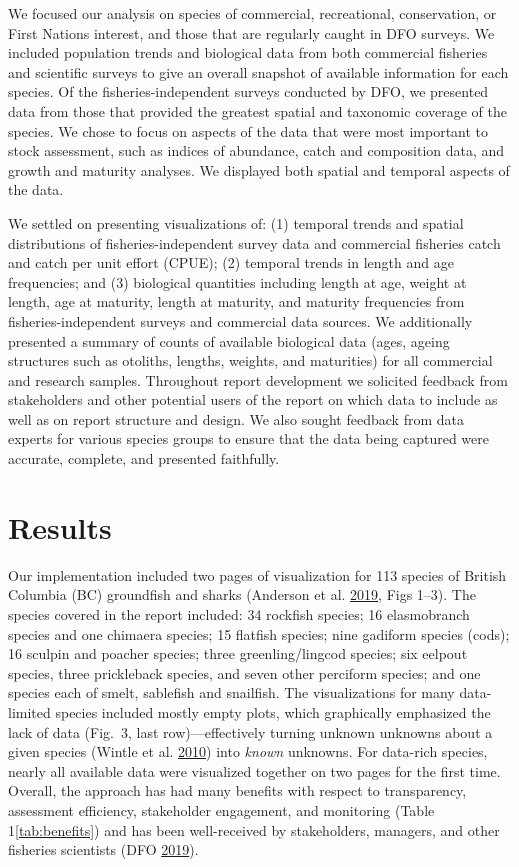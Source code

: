 \documentclass[12pt,]{article}
\begin{document}
We focused our analysis on species of commercial, recreational, conservation, or First Nations interest, and those that are regularly caught in DFO surveys. We included population trends and biological data from both commercial fisheries and scientific surveys to give an overall snapshot of available information for each species. Of the fisheries-independent surveys conducted by DFO, we presented data from those that provided the greatest spatial and taxonomic coverage of the species. We chose to focus on aspects of the data that were most important to stock assessment, such as indices of abundance, catch and composition data, and growth and maturity analyses. We displayed both spatial and temporal aspects of the data.

We settled on presenting visualizations of: (1) temporal trends and spatial distributions of fisheries-independent survey data and commercial fisheries catch and catch per unit effort (CPUE); (2) temporal trends in length and age frequencies; and (3) biological quantities including length at age, weight at length, age at maturity, length at maturity, and maturity frequencies from fisheries-independent surveys and commercial data sources. We additionally presented a summary of counts of available biological data (ages, ageing structures such as otoliths, lengths, weights, and maturities) for all commercial and research samples. Throughout report development we solicited feedback from stakeholders and other potential users of the report on which data to include as well as on report structure and design. We also sought feedback from data experts for various species groups to ensure that the data being captured were accurate, complete, and presented faithfully.

\hypertarget{results}{%
\section*{Results}\label{results}}

Our implementation included two pages of visualization for 113 species of British Columbia (BC) groundfish and sharks (Anderson et al. \protect\hyperlink{ref-anderson2019synopsis}{2019}, Figs 1--3). The species covered in the report included: 34 rockfish species; 16 elasmobranch species and one chimaera species; 15 flatfish species; nine gadiform species (cods); 16 sculpin and poacher species; three greenling/lingcod species; six eelpout species, three prickleback species, and seven other perciform species; and one species each of smelt, sablefish and snailfish. The visualizations for many data-limited species included mostly empty plots, which graphically emphasized the lack of data (Fig.~3, last row)---effectively turning unknown unknowns about a given species (Wintle et al. \protect\hyperlink{ref-wintle2010}{2010}) into \emph{known} unknowns. For data-rich species, nearly all available data were visualized together on two pages for the first time. Overall, the approach has had many benefits with respect to transparency, assessment efficiency, stakeholder engagement, and monitoring (Table 1\ref{tab:benefits}) and has been well-received by stakeholders, managers, and other fisheries scientists (DFO \protect\hyperlink{ref-dfo2019synopsis}{2019}).
\end{document}
